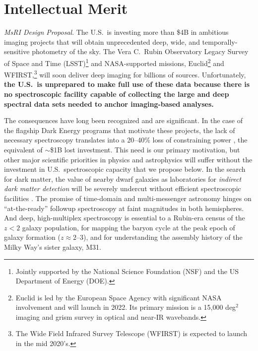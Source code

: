 \documentclass[oneside,11pt]{amsart}
\begin{document}


\setcounter{page}{1}


\section{Intellectual Merit}

\noindent \emph{MsRI Design Proposal}. The U.S.\ is investing more than \$4B in ambitious imaging projects that will obtain unprecedented deep, wide, and temporally-sensitive photometry of the sky.  The Vera C.~Rubin Observatory Legacy Survey of Space and Time (LSST)\footnote{Jointly supported by the National Science Foundation (NSF) and the US Department of Energy (DOE).} and NASA-supported missions, Euclid\footnote{Euclid is led by the European Space Agency with significant NASA involvement and will launch in 2022. Its primary mission is a 15,000 deg$^2$ imaging and grism survey in optical and near-IR wavebands.} and WFIRST,\footnote{The Wide Field Infrared Survey Telescope (WFIRST) is expected to launch in the mid 2020's.} will soon deliver deep imaging for billions of sources.  Unfortunately, \textbf{the U.S.\ is unprepared to make full use of these data because there is no spectroscopic facility capable of collecting the large and deep spectral data sets needed to anchor imaging-based analyses.}

The consequences have long been recognized \citep[e.g.,][]{NAP21722} and are significant.  In the case of the flagship
Dark Energy programs that motivate these projects, the lack of necessary spectroscopy translates into a 20--40\% loss
of constraining power \citep{newman15}, the equivalent of $\sim$\$1B lost investment.  This need is our primary
motivation, but other major scientific priorities in physics and astrophysics will suffer without the investment in
U.S.\ spectroscopic capacity that we propose below.  In the search for dark matter, the value of nearby dwarf galaxies
as laboratories for \emph{indirect dark matter detection} will be severely undercut without efficient spectroscopic
facilities \citep[e.g.,][]{simon19}.  The promise of time-domain and multi-messenger astronomy hinges on
``at-the-ready'' followup spectroscopy at faint magnitudes in both hemispheres.  And deep, high-multiplex spectroscopy
is essential to a Rubin-era census of the $z < 2$ galaxy population, for mapping the baryon cycle at the peak epoch of
galaxy formation ($z \approx 2$--3), and for understanding the assembly history of the Milky Way's sister galaxy, M31.
\end{document}
